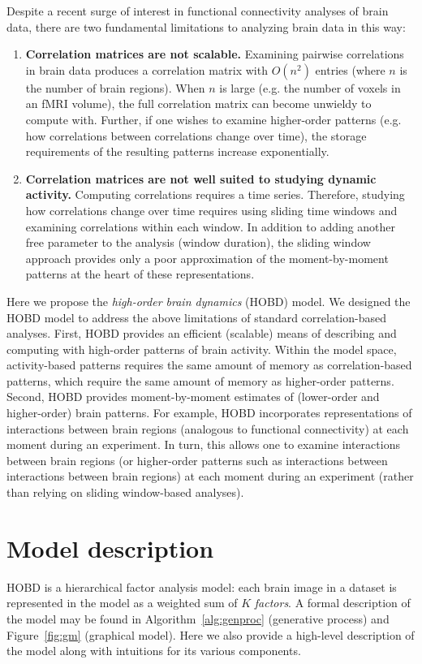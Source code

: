 \documentclass[12pt]{article}
\begin{document}
Despite a recent surge of interest in functional connectivity analyses
of brain data, there are two fundamental limitations to analyzing
brain data in this way:
\begin{enumerate}
\item \textbf{Correlation matrices are not scalable.}  Examining
  pairwise correlations in brain data produces a correlation matrix
  with $O(n^2)$ entries (where $n$ is the number of brain regions).
  When $n$ is large (e.g. the number of voxels in an fMRI volume), the
  full correlation matrix can become unwieldy to compute with.
  Further, if one wishes to examine higher-order patterns (e.g. how
  correlations between correlations change over time), the storage
  requirements of the resulting patterns increase exponentially.
\item \textbf{Correlation matrices are not well suited to studying
    dynamic activity.}  Computing correlations requires a time
  series.  Therefore, studying how correlations change over time
  requires using sliding time windows and examining correlations
  within each window.  In addition to adding another free parameter to
  the analysis (window duration), the sliding window approach provides
  only a poor approximation of the moment-by-moment patterns at the
  heart of these representations.
\end{enumerate}

Here we propose the \textit{high-order brain dynamics} (HOBD) model.
We designed the HOBD model to address the above limitations of
standard correlation-based analyses.  First, HOBD provides an
efficient (scalable) means of describing and computing with high-order
patterns of brain activity.  Within the model space, activity-based
patterns requires the same amount of memory as correlation-based
patterns, which require the same amount of memory as higher-order
patterns.  Second, HOBD provides moment-by-moment estimates of
(lower-order and higher-order) brain patterns.  For example, HOBD
incorporates representations of interactions between brain regions
(analogous to functional connectivity) at each moment during an
experiment.  In turn, this allows one to examine interactions between
brain regions (or higher-order patterns such as interactions between
interactions between brain regions) at each moment during an
experiment (rather than relying on sliding window-based analyses).

\section{Model description}
HOBD is a hierarchical factor analysis model: each brain image in a
dataset is represented in the model as a weighted sum of $K$
\textit{factors}.  A formal description of the model may be found in
Algorithm~\ref{alg:genproc} (generative process) and
Figure~\ref{fig:gm} (graphical model).  Here we also provide a
high-level description of the model along with intuitions for its
various components.
\end{document}
